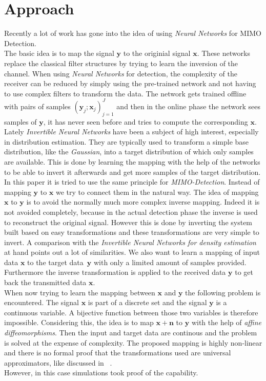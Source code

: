 \documentclass[oneside]{msvreport}%
\newcommand{\B}[1]{\boldsymbol{#1}}
\newcommand{\e}[1]{\emph{#1}}
\begin{document}
\section{Approach}
Recently a lot of work has gone into the idea of using \emph{Neural Networks} for {MIMO Detection}.\\ 
The basic idea is to map the signal $\B{y}$ to the originial signal $\B{x}$. These networks replace the classical filter structures by trying to learn the inversion of the channel. When using \e{Neural Networks} for detection, the complexity of the receiver can be reduced by simply using the pre-trained network and not having to use complex filters to transform the data. The network gets trained offline with pairs of samples $(\B{y}_j; \B{x}_j)_{j = 1}^{J}$ and then in the online phase the network sees samples of $\B{y}$, it has never seen before and tries to compute the corresponding $\B{x}$.\\ 
Lately \emph{Invertible Neural Networks} have been a subject of high interest, especially in distribution estimation. They are typically used to transform a simple base distribution, like the \emph{Gaussian}, into a target distribution of which only samples are available. This is done by learning the mapping with the help of the networks to be able to invert it afterwards and get more samples of the target distribution.\\
In this paper it is tried to use the same principle for \e{MIMO-Detection}. Instead of mapping $\B{y}$ to $\B{x}$ we try to connect them in the natural way. The idea of mapping $\B{x}$ to $\B{y}$ is to avoid the normally much more complex inverse mapping. Indeed it is not avoided completely, because in the actual detection phase the inverse is used to reconstruct the original signal. However this is done by inverting the system built based on easy transformations and these transformations are very simple to invert. A comparison with the \e{Invertible Neural Networks for density estimation} at hand points out a lot of similarities. We also want to learn a mapping of input data $\B{x}$ to the target data $\B{y}$ with only a limited amount of samples provided. Furthermore the inverse transformation is applied to the received data $\B{y}$ to get back the transmitted data $\B{x}$.\\ 

\noindent When now trying to learn the mapping between $\B{x}$ and $\B{y}$ the following problem is encountered. The signal $\B{x}$ is part of a discrete set and the signal $\B{y}$ is a continuous variable. A bijective function between those two variables is therefore impossible. Considering this, the idea is to map $\B{x} + \B{n}$ to $\B{y}$ with the help of \e{affine diffeomorphisms}. Then the input and target data are continous and the problem is solved at the expense of complexity. The proposed mapping is highly non-linear and there is no formal proof that the transformations used are universal approximators, like discussed in ~\cite{papamakarios2019normalizing}. \\However, in this case simulations took proof of the capability.
\end{document}
